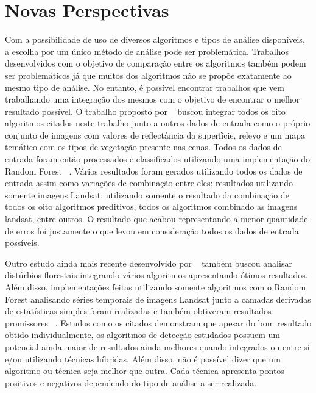 \documentclass[twocolumn]{article}
\begin{document}
\section{Novas Perspectivas}
Com a possibilidade de uso de diversos algoritmos e tipos de análise disponíveis, a escolha por um único método de análise pode ser problemática. Trabalhos desenvolvidos com o objetivo de comparação entre os algoritmos também podem ser problemáticos já que muitos dos algoritmos não se propõe exatamente ao mesmo tipo de análise. No entanto, é possível encontrar trabalhos que vem trabalhando uma integração dos mesmos com o objetivo de encontrar o melhor resultado possível. O trabalho proposto por ~\cite{HEALEY2018717} buscou integrar todos os oito algoritmos citados neste trabalho junto a outros dados de entrada como o próprio conjunto de imagens com valores de reflectância da superfície, relevo e um mapa temático com os tipos de vegetação presente nas cenas. Todos os dados de entrada foram então processados e classificados utilizando uma implementação do Random Forest ~\cite{Breiman2001}. Vários resultados foram gerados utilizando todos os dados de entrada assim como variações de combinação entre eles: resultados utilizando somente imagens Landsat, utilizando somente o resultado da combinação de todos os oito algoritmos preditivos, todos os algoritmos combinado as imagens landsat, entre outros. O resultado que acabou representando a menor quantidade de erros foi justamente o que levou em consideração todos os dados de entrada possíveis.
\par
Outro estudo ainda mais recente desenvolvido por ~\cite{BULLOCK2019111165} também buscou analisar distúrbios florestais integrando vários algoritmos apresentando ótimos resultados. Além disso, implementações feitas utilizando somente algoritmos com o Random Forest analisando séries temporais de imagens Landsat junto a camadas derivadas de estatísticas simples foram realizadas e também obtiveram resultados promissores ~\cite{WANG2019474}.
Estudos como os citados demonstram que apesar do bom resultado obtido individualmente, os algoritmos de detecção estudados possuem um potencial ainda maior de resultados ainda melhores quando integrados ou entre si e/ou utilizando técnicas híbridas. Além disso, não é possível dizer que um algoritmo ou técnica seja melhor que outra. Cada técnica apresenta pontos positivos e negativos dependendo do tipo de análise a ser realizada.
\end{document}
